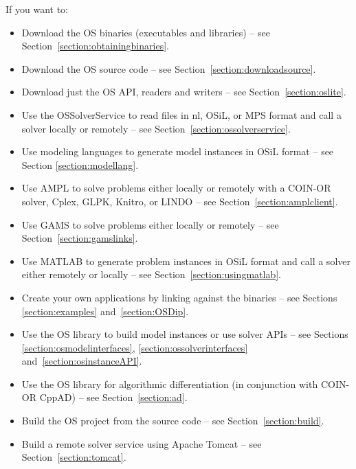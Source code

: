 \label{section:roadmap}

If you want to:

\begin{itemize}
\item Download the OS binaries  (executables and libraries) -- see Section~\ref{section:obtainingbinaries}.

\ifdevelop
\item Download the OS source code -- see Section~\ref{section:downloadsource}.

\item Download just the OS API, readers and writers -- see Section~\ref{section:oslite}.
\fi

\item Use the OSSolverService to read files in nl, OSiL, 
or MPS format and call a solver locally or remotely -- see Section~\ref{section:ossolverservice}.

\item Use modeling languages to generate model instances in OSiL format -- see Section \ref{section:modellang}.

\item Use AMPL to solve problems either locally or remotely
with a COIN-OR solver, Cplex,
GLPK, \ifknitro Knitro, \fi
or LINDO -- see Section~\ref{section:amplclient}.

\item Use GAMS to solve problems either locally or remotely -- see Section~\ref{section:gamslinks}.

\ifruncode\else
\item Use MATLAB to generate problem instances in OSiL format 
and call a solver either remotely or locally -- see Section~\ref{section:usingmatlab}.

\item Create your own applications by linking against the binaries -- see Sections \ref{section:examples} and~\ref{section:OSDip}.

\item Use the OS library to build model instances or use solver APIs -- see Sections \ref{section:osmodelinterfaces},
\ref{section:ossolverinterfaces} and~\ref{section:osinstanceAPI}.

\item Use the OS library for algorithmic differentiation (in conjunction with 
COIN-OR CppAD) -- see Section~\ref{section:ad}.

\item Build the OS project from the source code -- see Section~\ref{section:build}.
\fi

\ifdevelop
\item Build a remote solver service using Apache Tomcat -- see Section~\ref{section:tomcat}.
\fi
\end{itemize}

